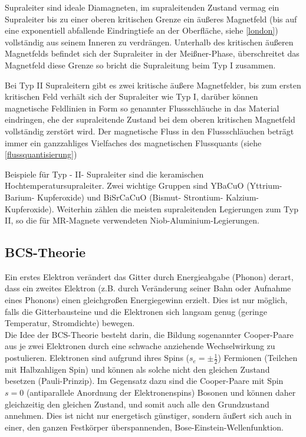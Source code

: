 \documentclass[12pt]{article}
\begin{document}
Supraleiter sind ideale Diamagneten, im supraleitenden Zustand vermag ein Supraleiter bis zu einer oberen kritischen Grenze ein äußeres Magnetfeld (bis auf eine exponentiell abfallende Eindringtiefe an der Oberfläche, siehe \ref{london}) vollständig aus seinem Inneren zu verdrängen. Unterhalb des kritischen äußeren Magnetfelds befindet sich der Supraleiter in der Meißner-Phase, überschreitet das Magnetfeld diese Grenze so bricht die Supraleitung beim Typ I zusammen.

Bei Typ II Supraleitern gibt es zwei kritische äußere Magnetfelder, bis zum ersten kritischen Feld verhält sich der Supraleiter wie Typ I, darüber können magnetische Feldlinien in Form so genannter Flussschläuche in das Material eindringen, ehe der supraleitende Zustand bei dem oberen kritischen Magnetfeld vollständig zerstört wird. Der magnetische Fluss in den Flussschläuchen beträgt immer ein ganzzahliges Vielfaches des magnetischen Flussquants (siehe \ref{flussquantisierung})

Beispiele für Typ - II- Supraleiter sind die keramischen Hochtemperatursupraleiter. Zwei wichtige Gruppen sind YBaCuO (Yttrium- Barium- Kupferoxide) und BiSrCaCuO (Bismut- Strontium- Kalzium- Kupferoxide). Weiterhin zählen die meisten supraleitenden Legierungen zum Typ II, so die für MR-Magnete verwendeten Niob-Aluminium-Legierungen.

\subsection{BCS-Theorie}
\label{bcs}
Ein erstes Elektron verändert das Gitter durch Energieabgabe (Phonon) derart, dass ein zweites Elektron (z.B. durch Veränderung seiner Bahn oder Aufnahme eines Phonons) einen gleichgroßen Energiegewinn erzielt. Dies ist nur möglich, falls die Gitterbausteine und die Elektronen sich langsam genug (geringe  Temperatur, Stromdichte) bewegen.\\

Die Idee der BCS-Theorie besteht darin, die Bildung sogenannter Cooper-Paare aus je zwei Elektronen durch eine schwache anziehende Wechselwirkung zu postulieren. Elektronen sind aufgrund ihres Spins ($s_e=\pm \frac{1}{2}$) Fermionen (Teilchen mit Halbzahligen Spin) und können als solche nicht den gleichen Zustand besetzen (Pauli-Prinzip). Im Gegensatz dazu sind die Cooper-Paare mit Spin $s=0$ (antiparallele Anordnung der Elektronenspins) Bosonen und können daher gleichzeitig den gleichen Zustand, und somit auch alle den Grundzustand annehmen. Dies ist nicht nur energetisch günstiger, sondern äußert sich auch in einer, den ganzen Festkörper überspannenden, Bose-Einstein-Wellenfunktion.\\
\end{document}
